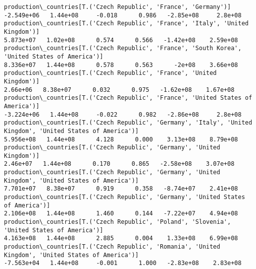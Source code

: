 \documentclass[11pt]{article}
\begin{document}
\begin{Verbatim}[commandchars=\\\{\}]
production\_countries[T.('Czech Republic', 'France', 'Germany')]                                                                                                                       -2.549e+06   1.44e+08     -0.018      0.986   -2.85e+08     2.8e+08
production\_countries[T.('Czech Republic', 'France', 'Italy', 'United Kingdom')]                                                                                                        5.873e+07   1.02e+08      0.574      0.566   -1.42e+08    2.59e+08
production\_countries[T.('Czech Republic', 'France', 'South Korea', 'United States of America')]                                                                                        8.336e+07   1.44e+08      0.578      0.563      -2e+08    3.66e+08
production\_countries[T.('Czech Republic', 'France', 'United Kingdom')]                                                                                                                  2.66e+06   8.38e+07      0.032      0.975   -1.62e+08    1.67e+08
production\_countries[T.('Czech Republic', 'France', 'United States of America')]                                                                                                      -3.224e+06   1.44e+08     -0.022      0.982   -2.86e+08     2.8e+08
production\_countries[T.('Czech Republic', 'Germany', 'Italy', 'United Kingdom', 'United States of America')]                                                                           5.956e+08   1.44e+08      4.128      0.000    3.13e+08    8.79e+08
production\_countries[T.('Czech Republic', 'Germany', 'United Kingdom')]                                                                                                                 2.46e+07   1.44e+08      0.170      0.865   -2.58e+08    3.07e+08
production\_countries[T.('Czech Republic', 'Germany', 'United Kingdom', 'United States of America')]                                                                                    7.701e+07   8.38e+07      0.919      0.358   -8.74e+07    2.41e+08
production\_countries[T.('Czech Republic', 'Germany', 'United States of America')]                                                                                                      2.106e+08   1.44e+08      1.460      0.144   -7.22e+07    4.94e+08
production\_countries[T.('Czech Republic', 'Poland', 'Slovenia', 'United States of America')]                                                                                           4.163e+08   1.44e+08      2.885      0.004    1.33e+08    6.99e+08
production\_countries[T.('Czech Republic', 'Romania', 'United Kingdom', 'United States of America')]                                                                                   -7.563e+04   1.44e+08     -0.001      1.000   -2.83e+08    2.83e+08

\end{Verbatim}
\end{document}
